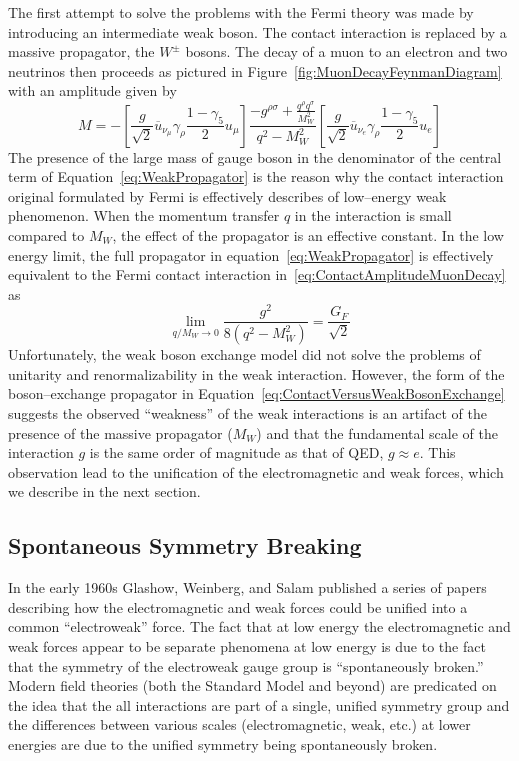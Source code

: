 The first attempt to solve the problems with the Fermi theory was made by
introducing an intermediate weak boson.  The contact interaction is replaced by
a massive propagator, the $W^\pm$ bosons.  The decay of a muon to an electron
and two neutrinos then proceeds as pictured in
Figure~\ref{fig:MuonDecayFeynmanDiagram} with an amplitude given
by~\cite{Morii:SMandBSM}
\begin{equation}
  M = - \left[\frac{g}{\sqrt{2}} \overline u_{\nu_\mu} \gamma_\rho \frac{1 -
  \gamma_5}{2} u_\mu\right] \frac{-g^{\rho\sigma} + \frac{q^\rho
  q^\sigma}{M_W^2}}{q^2 - M_W^2} 
  \left[\frac{g}{\sqrt{2}} \overline u_{\nu_e} \gamma_\rho \frac{1 -
  \gamma_5}{2} u_e\right]
  \label{eq:WeakPropagator}
\end{equation}
The presence of the large mass of gauge boson in the denominator of the central
term of Equation~\ref{eq:WeakPropagator} is the reason why the contact
interaction original formulated by Fermi is effectively describes of low--energy
weak phenomenon.  When the momentum transfer $q$ in the interaction is small
compared to $M_W$, the effect of the propagator is an effective constant.  In
the low energy limit, the full propagator in equation~\ref{eq:WeakPropagator} is
effectively equivalent to the Fermi contact interaction
in~\ref{eq:ContactAmplitudeMuonDecay} as
\begin{equation}
  \lim_{q/M_W \to 0}\frac{g^2}{8(q^2-M^2_W)} = \frac{G_F}{\sqrt{2}} 
  \label{eq:ContactVersusWeakBosonExchange}
\end{equation}
Unfortunately, the weak boson exchange model did not solve the problems of
unitarity and renormalizability in the weak interaction.   However, the form of
the boson--exchange propagator in
Equation~\ref{eq:ContactVersusWeakBosonExchange} suggests the observed
``weakness'' of the weak interactions is an artifact of the presence of the
massive propagator ($M_W$) and that the fundamental scale of the interaction $g$
is the same order of magnitude as that of QED, $g \approx e$.  This observation
lead to the unification of the electromagnetic and weak forces, which we
describe in the next section.

\subsection{Spontaneous Symmetry Breaking}
\label{sec:SSB}
In the early 1960s Glashow, Weinberg, and Salam published a series of papers
describing how the electromagnetic and weak forces could be unified into a
common ``electroweak'' force.  The fact that at low energy the electromagnetic
and weak forces appear to be separate phenomena at low energy is due to the fact that the
symmetry of the electroweak gauge group is ``spontaneously broken.''  Modern
field theories (both the Standard Model and beyond) are predicated on the idea
that the all interactions are part of a single, unified symmetry group and the 
differences between various scales (electromagnetic, weak, etc.) at lower
energies are due to the unified symmetry being spontaneously broken.


